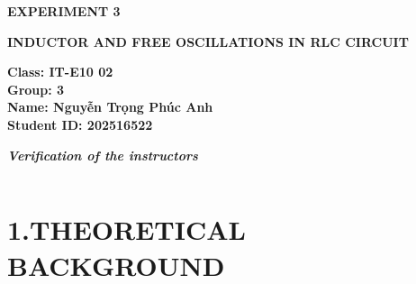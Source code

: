 \documentclass[12pt,oneside,a4paper]{article}
\theoremstyle{definition}
\begin{document}
	\renewcommand{\figurename}{Figure}
	\renewcommand{\tablename}{Table}
	
	\begin{center}
		\textbf{\Large EXPERIMENT 3}
		
		\vspace{0.5cm}
		\textbf{{\Large INDUCTOR AND FREE OSCILLATIONS IN RLC CIRCUIT}}
	\end{center}
	
	\vspace{0.5cm}
	
	\noindent
	\begin{minipage}[t]{0.5\textwidth}
		\vspace{0.5cm}
		\textbf{Class: IT-E10 02} \\[0.2cm]
		\textbf{Group: 3} \\[0.2cm]
		\textbf{Name: Nguyễn Trọng Phúc Anh} \\[0.2cm]
		\textbf{Student ID: 202516522}
	\end{minipage}%
	\begin{minipage}[t]{0.5\textwidth}
		\vspace{0pt}
		\centering
		\textit{\textbf{Verification of the instructors}} \\[0.2cm]
		\begin{tabular}{|p{3.5cm}|p{3.5cm}|}
			\hline
			& \\[2.5cm]
			\hline
		\end{tabular}
	\end{minipage}
	
	\vspace{0.8cm}
	
	\section*{1.THEORETICAL BACKGROUND}
	
\end{document}
